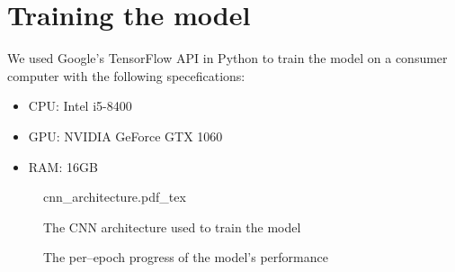 \documentclass[conference]{IEEEtran}
\begin{document}
\section{Training the model}
We used Google's TensorFlow API\cite{tensorflow2015-whitepaper} in Python to train the model on a consumer computer with the following specefications:
\begin{itemize}
    \item CPU: Intel i5-8400
    \item GPU: NVIDIA GeForce GTX 1060
    \item RAM: 16GB
\end{itemize}
\begin{figure}[!htp]
    \centering
    \def\svgwidth{\columnwidth}
    \scriptsize
    {cnn_architecture.pdf_tex}
    \caption{The CNN architecture used to train the model}\label{fig:cnn_architecture}
\end{figure}
\begin{figure}[!htp]
    \centering
    \scriptsize
    \caption{The per--epoch progress of the model's performance }
\end{figure}
\Blindtext
\end{document}
